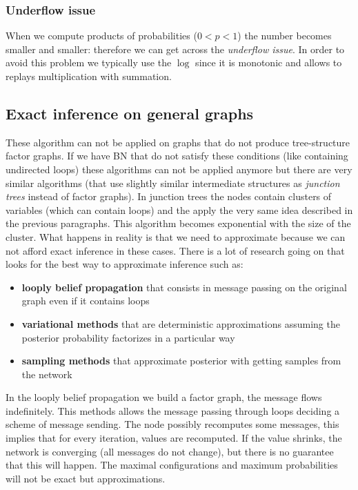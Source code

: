
\subsubsection{Underflow issue}
When we compute products of probabilities ($0 < p < 1$) the number becomes
smaller and smaller: therefore we can get across the \textit{underflow issue}. In
order to avoid this problem we typically use the $\log$ since it is monotonic and
allows to replays multiplication with summation.

\subsection{Exact inference on general graphs}
These algorithm can not be applied on graphs that do not produce tree-structure factor
graphs. If we have BN that do not satisfy these conditions (like containing undirected
loops) these algorithms can not be applied anymore but there are very similar
algorithms (that use slightly similar intermediate structures as \textit{junction
trees} instead of factor graphs). In junction trees the nodes contain clusters
of variables (which can contain loops) and the apply the very same idea
described in the previous paragraphs. This algorithm becomes exponential with the
size of the cluster. What happens in reality is that we need to approximate
because we can not afford exact inference in these cases. There is a lot of research
going on that looks for the best way to approximate inference such as:
\begin{itemize}
	\item \textbf{looply belief propagation} that consists in message passing on
		the original graph even if it contains loops

	\item \textbf{variational methods} that are deterministic approximations
		assuming the posterior probability factorizes in a particular way

	\item \textbf{sampling methods} that approximate posterior with getting
		samples from the network
\end{itemize}
In the looply belief propagation we build a factor graph, the message flows indefinitely.
This methods allows the message passing through loops deciding a scheme of
message sending. The node possibly recomputes some messages, this implies that
for every iteration, values are recomputed. If the value shrinks, the network is
converging (all messages do not change), but there is no guarantee that this
will happen. The maximal configurations and maximum probabilities will not be exact
but approximations. \\

